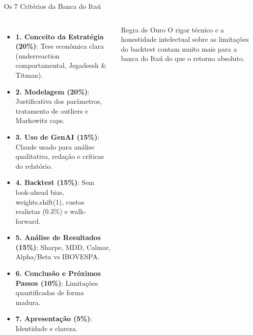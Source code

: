 \documentclass[aspectratio=169,12pt]{beamer}
\begin{document}
\begin{frame}[fragile]{Os 7 Critérios da Banca do Itaú}
\begin{columns}[T]
\begin{itemize}
  \item \textbf{1. Conceito da Estratégia (20\%)}: Tese econômica clara (underreaction comportamental, Jegadeesh \& Titman).
  \item \textbf{2. Modelagem (20\%)}: Justificativa dos parâmetros, tratamento de outliers e Markowitz caps.
  \item \textbf{3. Uso de GenAI (15\%)}: Claude usado para análise qualitativa, redação e críticas do relatório.
  \item \textbf{4. Backtest (15\%)}: Sem look-ahead bias, weights.shift(1), custos realistas (0.3\%) e walk-forward.
  \item \textbf{5. Análise de Resultados (15\%)}: Sharpe, MDD, Calmar, Alpha/Beta vs IBOVESPA.
  \item \textbf{6. Conclusão e Próximos Passos (10\%)}: Limitações quantificadas de forma madura.
  \item \textbf{7. Apresentação (5\%)}: Identidade e clareza.
\end{itemize}
\begin{alertblock}{Regra de Ouro}
O rigor técnico e a honestidade intelectual sobre as limitações do backtest contam muito mais para a banca do Itaú do que o retorno absoluto.
\end{alertblock}
\end{columns}
\end{frame}
\end{document}
